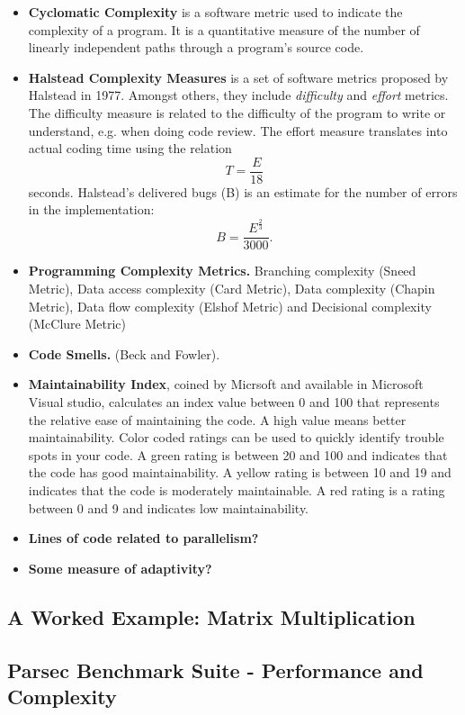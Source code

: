 \begin{itemize}
    \item \textbf{Cyclomatic Complexity} is a software metric used to indicate the complexity of a program. It is a quantitative measure of the number of linearly independent paths through a program's source code.
    \item \textbf{Halstead Complexity Measures} is a set of software metrics proposed by Halstead in 1977. Amongst others, they include \emph{difficulty} and \emph{effort} metrics. The difficulty measure is related to the difficulty of the program to write or understand, e.g. when doing code review. The effort measure translates into actual coding time using the relation $$T=\frac{E}{18}$$ seconds. Halstead's delivered bugs (B) is an estimate for the number of errors in the implementation:
    $$B=\frac{E^{\frac{2}{3}}}{3000}.$$
    \item \textbf{Programming Complexity Metrics.} Branching complexity (Sneed Metric), Data access complexity (Card Metric), Data complexity (Chapin Metric), Data flow complexity (Elshof Metric) and Decisional complexity (McClure Metric) 
    \item \textbf{Code Smells.} (Beck and Fowler). 
    \item \textbf{Maintainability Index}, coined by Micrsoft and available in Microsoft Visual studio, calculates an index value between 0 and 100 that represents the relative ease of maintaining the code. A high value means better maintainability. Color coded ratings can be used to quickly identify trouble spots in your code. A green rating is between 20 and 100 and indicates that the code has good maintainability. A yellow rating is between 10 and 19 and indicates that the code is moderately maintainable. A red rating is a rating between 0 and 9 and indicates low maintainability.
    \item \textbf{Lines of code related to parallelism?}
    \item \textbf{Some measure of adaptivity?}
\end{itemize}

\subsection{A Worked Example: Matrix Multiplication}

\subsection{Parsec Benchmark Suite - Performance and Complexity}

